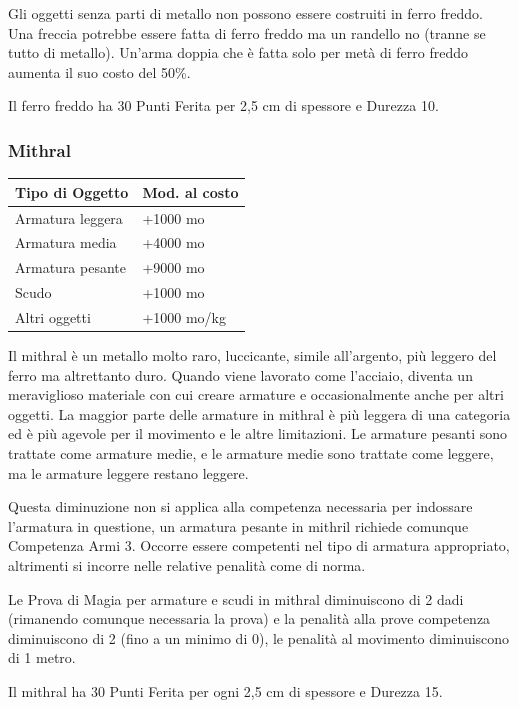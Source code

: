 \begin{multicols}{2}
Gli oggetti senza parti di metallo non possono essere costruiti in ferro freddo. Una freccia potrebbe essere fatta di ferro freddo ma un randello no (tranne se tutto di metallo). Un'arma doppia che è fatta solo per metà di ferro freddo aumenta il suo costo del 50\%.

Il ferro freddo ha 30 Punti Ferita per 2,5 cm di spessore e Durezza 10.


\subsubsection{Mithral}

\label{mithral}

\begin{tabularx}{0.48\textwidth}{Xl}
\textbf{Tipo di Oggetto} & \textbf{Mod. al costo}\\
\toprule
Armatura leggera & +1000 mo\\
Armatura media & +4000 mo\\
Armatura pesante & +9000 mo\\
Scudo & +1000 mo\\
Altri oggetti & +1000 mo/kg
\end{tabularx}

\medskip

Il mithral è un metallo molto raro, luccicante, simile all'argento, più leggero del ferro ma altrettanto duro. Quando viene lavorato come l'acciaio, diventa un meraviglioso materiale con cui creare armature e occasionalmente anche per altri oggetti. La maggior parte delle armature in mithral è più leggera di una categoria ed è più agevole per il movimento e le altre limitazioni. Le armature pesanti sono trattate come armature medie, e le armature medie sono trattate come leggere, ma le armature leggere restano leggere.

Questa diminuzione non si applica alla competenza necessaria per indossare l'armatura in questione, un armatura pesante in mithril richiede comunque Competenza Armi 3. Occorre essere competenti nel tipo di armatura appropriato, altrimenti si incorre nelle relative penalità come di norma.

Le Prova di Magia per armature e scudi in mithral diminuiscono di 2 dadi (rimanendo comunque necessaria la prova) e la penalità alla prove competenza diminuiscono di 2 (fino a un minimo di 0), le penalità al movimento diminuiscono di 1 metro.

Il mithral ha 30 Punti Ferita per ogni 2,5 cm di spessore e Durezza 15.


\end{multicols}
